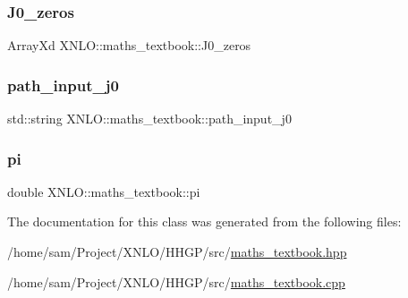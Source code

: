 \subsubsection{\texorpdfstring{J0\+\_\+zeros}{J0\_zeros}}
{\footnotesize\ttfamily Array\+Xd X\+N\+L\+O\+::maths\+\_\+textbook\+::\+J0\+\_\+zeros}

\mbox{\label{class_x_n_l_o_1_1maths__textbook_adcff34ca6555b48649b0548cfb173f72}} 
\subsubsection{\texorpdfstring{path\+\_\+input\+\_\+j0}{path\_input\_j0}}
{\footnotesize\ttfamily std\+::string X\+N\+L\+O\+::maths\+\_\+textbook\+::path\+\_\+input\+\_\+j0\hspace{0.3cm}{\ttfamily [private]}}

\mbox{\label{class_x_n_l_o_1_1maths__textbook_aa8506848e319f99a4b40fe4a99af1af9}} 
\subsubsection{\texorpdfstring{pi}{pi}}
{\footnotesize\ttfamily double X\+N\+L\+O\+::maths\+\_\+textbook\+::pi}



The documentation for this class was generated from the following files\+:\begin{DoxyCompactItemize}
\item 
/home/sam/\+Project/\+X\+N\+L\+O/\+H\+H\+G\+P/src/\hyperlink{maths__textbook_8hpp}{maths\+\_\+textbook.\+hpp}\item 
/home/sam/\+Project/\+X\+N\+L\+O/\+H\+H\+G\+P/src/\hyperlink{maths__textbook_8cpp}{maths\+\_\+textbook.\+cpp}\end{DoxyCompactItemize}
